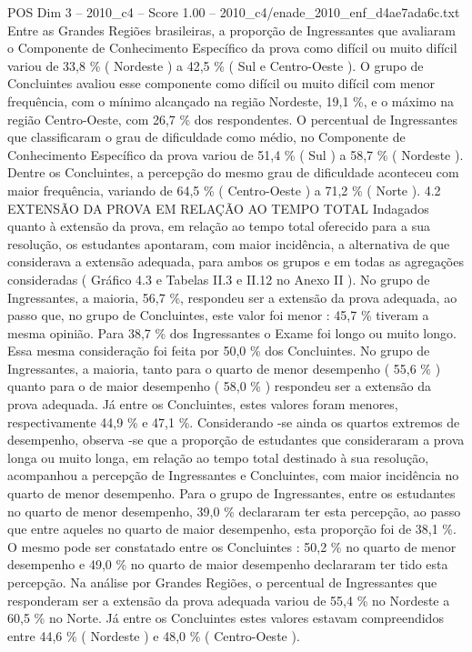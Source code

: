 \begin{textsample}{POS Dim 3 – 2010\_c4 – Score 1.00 – 2010\_c4/enade\_2010\_enf\_d4ae7ada6c.txt}
Entre as Grandes Regiões brasileiras, a proporção de Ingressantes que avaliaram o Componente de Conhecimento Específico da prova como difícil ou muito difícil variou de 33,8 \% ( Nordeste ) a 42,5 \% ( Sul e Centro-Oeste ).
O grupo de Concluintes avaliou esse componente como difícil ou muito difícil com menor frequência, com o mínimo alcançado na região Nordeste, 19,1 \%, e o máximo na região Centro-Oeste, com 26,7 \% dos respondentes.
O percentual de Ingressantes que classificaram o grau de dificuldade como médio, no Componente de Conhecimento Específico da prova variou de 51,4 \% ( Sul ) a 58,7 \% ( Nordeste ).
Dentre os Concluintes, a percepção do mesmo grau de dificuldade aconteceu com maior frequência, variando de 64,5 \% ( Centro-Oeste ) a 71,2 \% ( Norte ). 4.2 EXTENSÃO DA PROVA EM RELAÇÃO AO TEMPO TOTAL Indagados quanto à extensão da prova, em relação ao tempo total oferecido para a sua resolução, os estudantes apontaram, com maior incidência, a alternativa de que considerava a extensão adequada, para ambos os grupos e em todas as agregações consideradas ( Gráfico 4.3 e Tabelas II.3 e II.12 no Anexo II ).
No grupo de Ingressantes, a maioria, 56,7 \%, respondeu ser a extensão da prova adequada, ao passo que, no grupo de Concluintes, este valor foi menor : 45,7 \% tiveram a mesma opinião.
Para 38,7 \% dos Ingressantes o Exame foi longo ou muito longo.
Essa mesma consideração foi feita por 50,0 \% dos Concluintes.
No grupo de Ingressantes, a maioria, tanto para o quarto de menor desempenho ( 55,6 \% ) quanto para o de maior desempenho ( 58,0 \% ) respondeu ser a extensão da prova adequada.
Já entre os Concluintes, estes valores foram menores, respectivamente 44,9 \% e 47,1 \%.
Considerando -se ainda os quartos extremos de desempenho, observa -se que a proporção de estudantes que consideraram a prova longa ou muito longa, em relação ao tempo total destinado à sua resolução, acompanhou a percepção de Ingressantes e Concluintes, com maior incidência no quarto de menor desempenho.
Para o grupo de Ingressantes, entre os estudantes no quarto de menor desempenho, 39,0 \% declararam ter esta percepção, ao passo que entre aqueles no quarto de maior desempenho, esta proporção foi de 38,1 \%.
O mesmo pode ser constatado entre os Concluintes : 50,2 \% no quarto de menor desempenho e 49,0 \% no quarto de maior desempenho declararam ter tido esta percepção.
Na análise por Grandes Regiões, o percentual de Ingressantes que responderam ser a extensão da prova adequada variou de 55,4 \% no Nordeste a 60,5 \% no Norte.
Já entre os Concluintes estes valores estavam compreendidos entre 44,6 \% ( Nordeste ) e 48,0 \% ( Centro-Oeste ).

\end{textsample}
